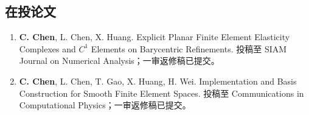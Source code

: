 \documentclass[11pt,a4paper]{ctexart}
\begin{document}
\subsection{在投论文}
\begin{enumerate}
\item \textbf{C. Chen}, L. Chen, X. Huang. Explicit Planar Finite Element Elasticity Complexes and $C^1$ Elements on Barycentric Refinements. 投稿至 SIAM Journal on Numerical Analysis；一审返修稿已提交。
\item \textbf{C. Chen}, L. Chen, T. Gao, X. Huang, H. Wei. Implementation and Basis Construction for Smooth Finite Element Spaces. 投稿至 Communications in Computational Physics；一审返修稿已提交。
\end{enumerate}
\end{document}

